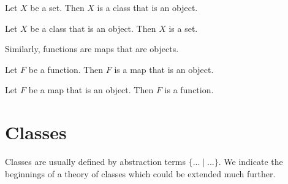 \documentclass{article}
\begin{document}
\begin{forthel}
  \begin{lemma}
    Let $X$ be a set.
    Then $X$ is a class that is an object.
  \end{lemma}

  \begin{lemma}
    Let $X$ be a class that is an object.
    Then $X$ is a set.
  \end{lemma}
\end{forthel}
%
Similarly, functions are maps that are objects.
\begin{forthel}
  \begin{lemma}
    Let $F$ be a function.
    Then $F$ is a map that is an object.
  \end{lemma}

  \begin{lemma}
    Let $F$ be a map that is an object.
    Then $F$ is a function.
  \end{lemma}
\end{forthel}

\section{Classes}

Classes are usually defined by
abstraction terms $\{ ... \mid ... \}$. We indicate the
beginnings of a theory of classes which could be extended
much further.
\end{document}
